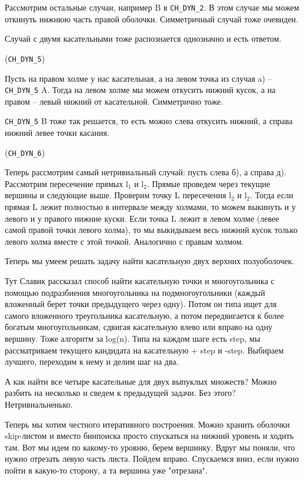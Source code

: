 \documentclass[11pt]{article}
\begin{document}
Рассмотрим остальные случаи, например B в \verb~CH_DYN_2~. В этом случае мы
можем откинуть нижнюю часть правой оболочки. Симметричный случай
тоже очевиден.

Случай с двумя касательными тоже распознается однозначно и есть
ответом.

(\verb~CH_DYN_5~)

Пусть на правом холме у нас касательная, а на левом точка из случая
a) -- \verb~CH_DYN_5~ A. Тогда на левом холме мы можем откусить нижний
кусок, а на правом -- левый нижний от касательной. Симметрично тоже.

\verb~CH_DYN_5~ B тоже так решается, то есть можно слева откусить нижний, а
справа нижний левее точки касания.

(\verb~CH_DYN_6~)

Теперь рассмотрим самый нетривиальный случай: пусть слева б), а
справа д). Рассмотрим пересечение прямых l$_{\text{1}}$ и l$_{\text{2}}$. Прямые проведем
через текущие вершины и следующие выше. Проверим точку L пересечения
l$_{\text{2}}$ и l$_{\text{2}}$. Тогда если прямая L лежит полностью в интервале между
холмами, то можем выкинуть и у левого и у правого нижние куски. Если
точка L лежит в левом холме (левее самой правой точки левого холма),
то мы выкидываем весь нижний кусок только левого холма вместе с этой
точкой. Аналогично с правым холмом.

Теперь мы умеем решать задачу найти касательную двух верхних
полуоболочек.

Тут Славик рассказал способ найти касательную точки и многоугольника
с помощью подразбиения многоугольника на подмногоугольники (каждый
вложенный берет точки предыдущего через одну). Потом он типа ищет
для самого вложенного треугольника касательную, а потом
передвигается к более богатым многоугольникам, сдвигая касательную
влево или вправо на одну вершину. Тоже алгоритм за log(n). Типа на
каждом шаге есть step, мы рассматриваем текущего кандидата на
касательную + step и -step. Выбираем лучшего, переходим к нему и
делим шаг на два.

А как найти все четыре касательные для двух выпуклых множеств?
Можно разбить на несколько и сведем к предыдущей задачи. Без этого?
Нетривиальненько.



Теперь мы хотим честного итеративного построения. Можно хранить
оболочки skip-листом и вместо бинпоиска просто спускаться на нижний
уровень и ходить там. Вот мы идем по какому-то уровню, берем
вершинку. Вдруг мы поняли, что нужно отрезать левую часть
листа. Пойдем вправо. Спускаемся вниз, если нужно пойти в какую-то
сторону, а та вершина уже "отрезана".
\end{document}
